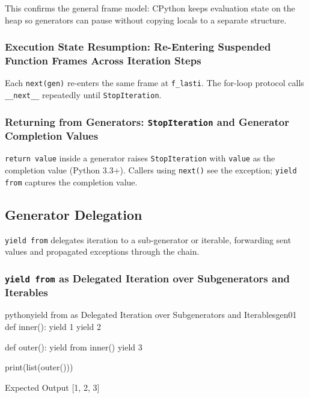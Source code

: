\documentclass[a4paper,twoside]{report}
\begin{document}
This confirms the general frame model: CPython keeps evaluation state on the heap so generators can pause without copying locals to a separate structure.

\subsubsection{Execution State Resumption: Re-Entering Suspended Function Frames Across Iteration Steps}

Each \texttt{next(gen)} re-enters the same frame at \texttt{f\_lasti}. The for-loop protocol calls \texttt{\_\_next\_\_} repeatedly until \texttt{StopIteration}.

\subsubsection{Returning from Generators: \texttt{StopIteration} and Generator Completion Values}

\texttt{return value} inside a generator raises \texttt{StopIteration} with \texttt{value} as the completion value (Python 3.3+). Callers using \texttt{next()} see the exception; \texttt{yield from} captures the completion value.


\subsection{Generator Delegation}

\texttt{yield from} delegates iteration to a sub-generator or iterable, forwarding sent values and propagated exceptions through the chain.

\subsubsection{\texttt{yield from} as Delegated Iteration over Subgenerators and Iterables}

\begin{codebox}[]{python}{yield from as Delegated Iteration over Subgenerators and Iterables}{gen01}
def inner():
    yield 1
    yield 2

def outer():
    yield from inner()
    yield 3

print(list(outer()))
\end{codebox}


\begin{iobox}{Expected Output}
[1, 2, 3] \\
\end{iobox}
\end{document}
